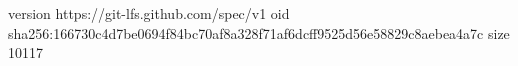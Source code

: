 version https://git-lfs.github.com/spec/v1
oid sha256:166730c4d7be0694f84bc70af8a328f71af6dcff9525d56e58829c8aebea4a7c
size 10117
